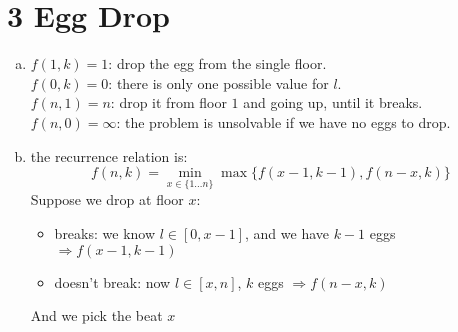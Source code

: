 \documentclass[11pt]{article}
\newenvironment{qparts}{\begin{enumerate}[(a)]}{\end{enumerate}}
\begin{document}
	\section*{3 Egg Drop}
	\begin{qparts}
		\item 
		$f(1, k) = 1$: drop the egg from the single floor.\\
		$f(0, k) = 0$: there is only one possible value for $l$.\\
		$f(n, 1) = n$:  drop it from floor $1$ and going up, until it breaks.\\
		$f(n, 0) = \infty$:  the problem is unsolvable if we have no eggs to drop.
		
		\item the recurrence relation is:
		$$f(n, k) = \min_{x\in \{1\dots n\}} \max\{f(x-1, k-1), f(n-x, k)\}$$
		Suppose we drop at floor $x$:
		\begin{itemize}
			\item breaks: we know $l \in [0, x-1]$, and we have $k-1$ eggs $\Rightarrow f(x-1, k-1)$
			
			\item doesn't break: now $l \in [x, n]$, $k$ eggs $\Rightarrow f(n-x, k)$
		\end{itemize}
		And we pick the beat $x$
	\end{qparts}
\end{document}
